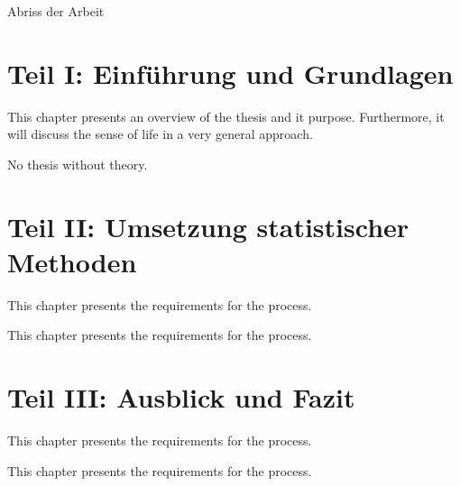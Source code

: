 \clearemptydoublepage

{}

\begin{center}
	\huge{Abriss der Arbeit}
\end{center}




\section*{Teil I: Einführung und Grundlagen}

  \vspace{1mm}

\noindent  This chapter presents an overview of the thesis and it purpose. Furthermore, it will discuss the sense of life in a very general approach. \\

  \vspace{1mm}

\noindent  No thesis without theory. \\

\section*{Teil II: Umsetzung statistischer Methoden}

  \vspace{1mm}

\noindent  This chapter presents the requirements for the process. \\

  \vspace{1mm}

\noindent  This chapter presents the requirements for the process. \\

\section*{Teil III: Ausblick und Fazit}

  \vspace{1mm}

\noindent  This chapter presents the requirements for the process. \\

  \vspace{1mm}

\noindent  This chapter presents the requirements for the process.

